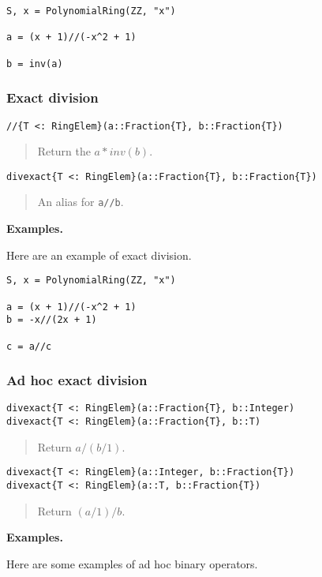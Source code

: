 \documentclass[a4paper,10pt]{article}
\newcommand{\code}{\lstinline}
\newcommand{\desc}[1]{\vspace{-3mm}\begin{quote}#1\end{quote}}
\begin{document}
\begin{lstlisting}
S, x = PolynomialRing(ZZ, "x")

a = (x + 1)//(-x^2 + 1)

b = inv(a)
\end{lstlisting}

\subsubsection{Exact division}

\begin{lstlisting}
//{T <: RingElem}(a::Fraction{T}, b::Fraction{T})
\end{lstlisting}

\desc{Return the $a*inv(b)$.}

\begin{lstlisting}
divexact{T <: RingElem}(a::Fraction{T}, b::Fraction{T})
\end{lstlisting}

\desc{An alias for \code{a//b}.}

\textbf{Examples.}

Here are an example of exact division.

\begin{lstlisting}
S, x = PolynomialRing(ZZ, "x")

a = (x + 1)//(-x^2 + 1) 
b = -x//(2x + 1)

c = a//c
\end{lstlisting}

\subsubsection{Ad hoc exact division}

\begin{lstlisting}
divexact{T <: RingElem}(a::Fraction{T}, b::Integer)
divexact{T <: RingElem}(a::Fraction{T}, b::T)
\end{lstlisting}

\desc{Return $a / (b/1)$.}

\begin{lstlisting}
divexact{T <: RingElem}(a::Integer, b::Fraction{T})
divexact{T <: RingElem}(a::T, b::Fraction{T})
\end{lstlisting}

\desc{Return $(a/1) / b$.}

\textbf{Examples.}

Here are some examples of ad hoc binary operators.
\end{document}

